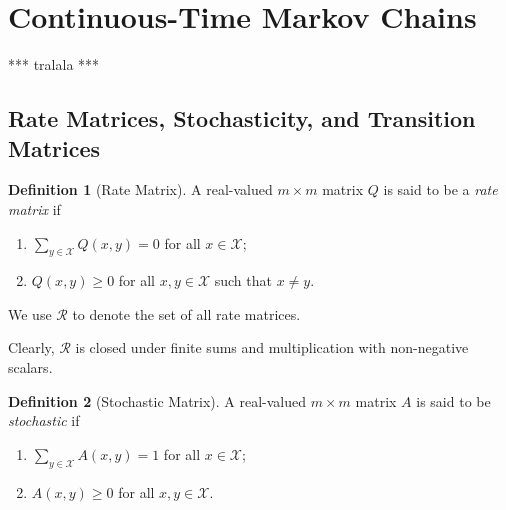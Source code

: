 \documentclass[10pt]{paper}
\theoremstyle{definition}
\newtheorem{definition}{Definition}
\newcommand{\states}{\mathcal{X}}
\begin{document}
\section{Continuous-Time Markov Chains}

*** tralala ***

\subsection{Rate Matrices, Stochasticity, and Transition Matrices}

\begin{definition}[Rate Matrix]\label{def:rate_matrix}
A real-valued $m\times m$ matrix $Q$ is said to be a \emph{rate matrix} if

\vspace{5pt}
\begin{enumerate}[label=R\arabic*:]
\item
$\sum_{y\in\states}Q(x,y)=0$ for all $x\in\states$;
\item
$Q(x,y)\geq0$ for all $x,y\in\states$ such that $x\neq y$.
\end{enumerate}
\vspace{5pt}
\noindent
We use $\mathcal{R}$ to denote the set of all rate matrices. 
\end{definition}

Clearly, $\mathcal{R}$ is closed under finite sums and multiplication with non-negative scalars. 

\begin{definition}[Stochastic Matrix]\label{def:stoch_matrix}
A real-valued $m\times m$ matrix $A$ is said to be \emph{stochastic} if
\vspace{5pt}
\begin{enumerate}[label=S\arabic*:]
\item
$\sum_{y\in\states}A(x,y)=1$ for all $x\in\states$;
\item
$A(x,y)\geq0$ for all $x,y\in\states$.
\end{enumerate}
\vspace{5pt}
\noindent
\end{definition}
\end{document}
